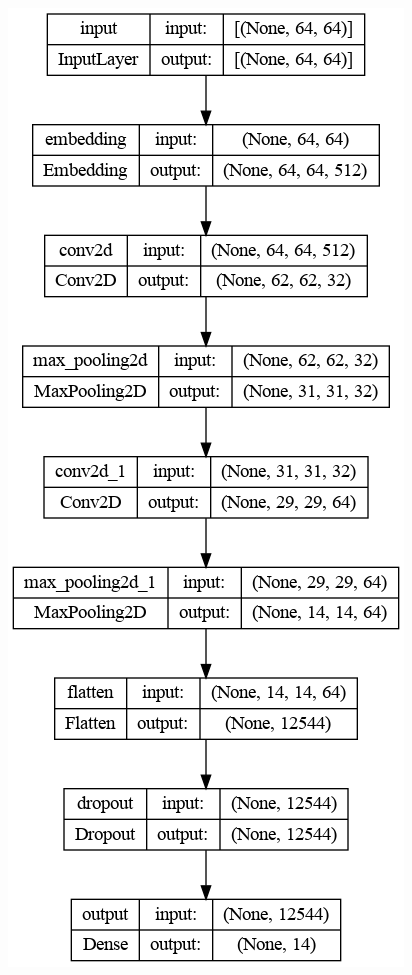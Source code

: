 \begin{figure}[ht!] 
	\center
	\includegraphics [scale=0.3] {my_folder/images/model_bond}

\end{figure}
